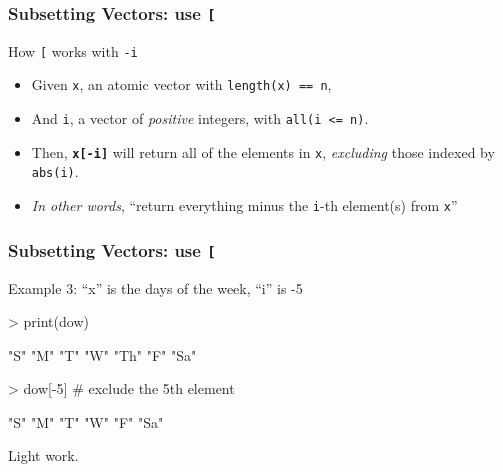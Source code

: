 \documentclass{beamer}
\newcommand{\R}[1]{\texttt{#1}}
\begin{document}
\begin{frame}[fragile]
\frametitle{Subsetting Vectors: use \R{[}}

How \R{[} works with \R{-i}
\begin{itemize}
\item Given \R{x}, an atomic vector with \R{length(x) == n},
\item And \R{i}, a vector of \textit{positive} integers, with \R{all(i <= n)}.
\item Then, \R{\textbf{x[-i]}} will return all of the elements in \R{x}, \textit{excluding} those indexed by \R{abs(i)}.
\item \textit{In other words}, ``return everything minus the \R{i}-th element(s) from \R{x}''
\end{itemize}

\end{frame}



\begin{frame}[fragile]
\frametitle{Subsetting Vectors: use \R{[}}

Example 3: ``x'' is the days of the week, ``i'' is -5
\pause
\begin{Schunk}
\begin{Sinput}
> print(dow)
\end{Sinput}
\begin{Soutput}
[1] "S"  "M"  "T"  "W"  "Th" "F"  "Sa"
\end{Soutput}
\end{Schunk}
\pause
\begin{Schunk}
\begin{Sinput}
> dow[-5] # exclude the 5th element 
\end{Sinput}
\end{Schunk}
\pause
\begin{Schunk}
\begin{Soutput}
[1] "S"  "M"  "T"  "W"  "F"  "Sa"
\end{Soutput}
\end{Schunk}
\pause
Light work.

\end{frame}
\end{document}

